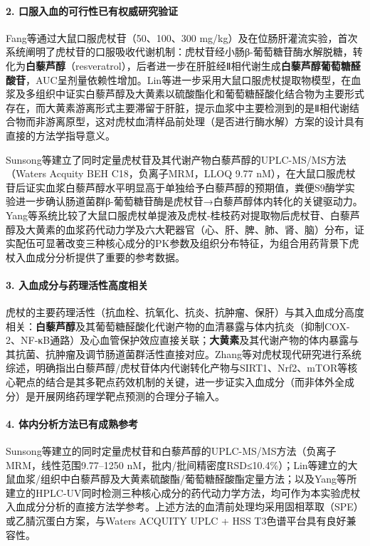 \documentclass[12pt,a4paper,UTF8,scheme=chinese]{ctexart}
\newcommand{\compoundname}[1]{\textbf{#1}}
\begin{document}
\paragraph{2. 口服入血的可行性已有权威研究验证}

Fang等\cite{Fang2009}通过大鼠口服虎杖苷（50、100、300 mg/kg）及在位肠肝灌流实验，首次系统阐明了虎杖苷的口服吸收代谢机制：虎杖苷经小肠β-葡萄糖苷酶水解脱糖，转化为\compoundname{白藜芦醇}（resveratrol），后者进一步在肝脏经Ⅱ相代谢生成\compoundname{白藜芦醇葡萄糖醛酸苷}，AUC呈剂量依赖性增加。Lin等\cite{Lin2012}进一步采用大鼠口服虎杖提取物模型，在血浆及多组织中证实白藜芦醇及大黄素以硫酸酯化和葡萄糖醛酸化结合物为主要形式存在，而大黄素游离形式主要滞留于肝脏，提示血浆中主要检测到的是Ⅱ相代谢结合物而非游离原型，这对虎杖血清样品前处理（是否进行酶水解）方案的设计具有直接的方法学指导意义。

Sunsong等\cite{Sunsong2021}建立了同时定量虎杖苷及其代谢产物白藜芦醇的UPLC-MS/MS方法（Waters Acquity BEH C18，负离子MRM，LLOQ 9.77 nM），在大鼠口服虎杖苷后证实血浆白藜芦醇水平明显高于单独给予白藜芦醇的预期值，粪便S9酶学实验进一步确认肠道菌群β-葡萄糖苷酶是虎杖苷→白藜芦醇体内转化的关键驱动力。Yang等\cite{Yang2024}系统比较了大鼠口服虎杖单提液及虎杖-桂枝药对提取物后虎杖苷、白藜芦醇及大黄素的血浆药代动力学及六大靶器官（心、肝、脾、肺、肾、脑）分布，证实配伍可显著改变三种核心成分的PK参数及组织分布特征，为组合用药背景下虎杖入血成分分析提供了重要的参考数据。

\paragraph{3. 入血成分与药理活性高度相关}

虎杖的主要药理活性（抗血栓、抗氧化、抗炎、抗肿瘤、保肝）与其入血成分高度相关：\compoundname{白藜芦醇}及其葡萄糖醛酸化代谢产物的血清暴露与体内抗炎（抑制COX-2、NF-κB通路）及心血管保护效应直接关联；\compoundname{大黄素}及其代谢产物的体内暴露与其抗菌、抗肿瘤及调节肠道菌群活性直接对应。Zhang等\cite{ZhangY2023}对虎杖现代研究进行系统综述，明确指出白藜芦醇/虎杖苷体内代谢转化产物与SIRT1、Nrf2、mTOR等核心靶点的结合是其多靶点药效机制的关键，进一步证实入血成分（而非体外全成分）是开展网络药理学靶点预测的合理分子输入。

\paragraph{4. 体内分析方法已有成熟参考}

Sunsong等\cite{Sunsong2021}建立的同时定量虎杖苷和白藜芦醇的UPLC-MS/MS方法（负离子MRM，线性范围9.77--1250 nM，批内/批间精密度RSD≤10.4\%）；Lin等\cite{Lin2012}建立的大鼠血浆/组织中白藜芦醇及大黄素硫酸酯/葡萄糖醛酸酯定量方法；以及Yang等\cite{Yang2024}所建立的HPLC-UV同时检测三种核心成分的药代动力学方法，均可作为本实验虎杖入血成分分析的直接方法学参考。上述方法的血清前处理均采用固相萃取（SPE）或乙腈沉蛋白方案，与Waters ACQUITY UPLC + HSS T3色谱平台具有良好兼容性。
\end{document}

